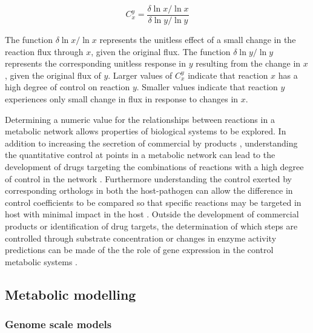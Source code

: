 \begin{equation}\label{fcc}
C_{x}^{y} = \frac{ \delta \ln x / \ln x}{\delta \ln y / \ln y}
\end{equation}

The function $\delta \ln x / \ln x$ represents the unitless effect of a small change in the reaction flux through $x$, given the original flux. The function $\delta \ln y / \ln y$ represents the corresponding unitless response in $y$ resulting from the change in $x$, given the original flux of $y$. Larger values of $C_{x}^{y}$ indicate that reaction $x$ has a high degree of control on reaction $y$. Smaller values indicate that reaction $y$ experiences only small change in flux in response to changes in $x$.


Determining a numeric value for the relationships between reactions in a metabolic network allows properties of biological systems to be explored. In addition to increasing the secretion of commercial by products \cite{niederberger1992}, understanding the quantitative control at points in a metabolic network can lead to the development of drugs targeting the combinations of reactions with a high degree of control in the network \cite{lehar2008,hopkins2008}. Furthermore understanding the control exerted by corresponding orthologs in both the host-pathogen can allow the difference in control coefficients to be compared so that specific reactions may be targeted in host with minimal impact in the host \cite{hornberg2007}. Outside the development of commercial products or identification of drug targets, the determination of which steps are controlled through substrate concentration or changes in enzyme activity predictions can be made of the the role of gene expression in the control metabolic systems \cite{rossell2006,daran-lapujade2007}.


\subsection{Metabolic modelling}

\subsubsection{Genome scale models}

